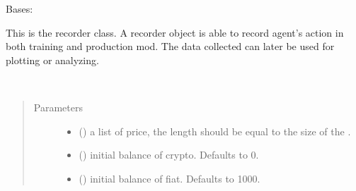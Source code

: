 \documentclass[letterpaper,10pt,english]{sphinxmanual}
\begin{document}
\begin{fulllineitems}
\label{\detokenize{Recorder:crypto_env.recorder.Recorder}}
\sphinxAtStartPar
Bases: 

\sphinxAtStartPar
This is the recorder class. A recorder object is able to record agent’s action in both training and production mod. The data collected can later be used for plotting or analyzing.

\begin{fulllineitems}
\label{\detokenize{Recorder:crypto_env.recorder.Recorder.__init__}}~\begin{quote}\begin{description}
\item[{Parameters}] \leavevmode\begin{itemize}
\item {} 
\sphinxAtStartPar
{} () \textendash{} a list of price, the length should be equal to the size of the .

\item {} 
\sphinxAtStartPar
{} (\sphinxstyleliteralemphasis{\sphinxupquote{, }}) \textendash{} initial balance of crypto. Defaults to 0.

\item {} 
\sphinxAtStartPar
{} (\sphinxstyleliteralemphasis{\sphinxupquote{, }}) \textendash{} initial balance of fiat. Defaults to 1000.


\end{itemize}
\end{description}
\end{quote}
\end{fulllineitems}
\end{fulllineitems}
\end{document}
